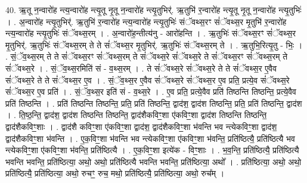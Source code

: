 \documentclass[17pt]{extarticle}
\begin{document}
40. ऋ॒तू न॒न्वारो॑ह न्त्य॒न्वारो॑ह न्त्यृ॒तू नृ॒तू न॒न्वारो॑ह न्त्यृ॒तुभिर्॑. ऋ॒तुभि॑ र॒न्वारो॑ह न्त्यृ॒तू नृ॒तू न॒न्वारो॑ह न्त्यृ॒तुभिः॑ । . अ॒न्वारो॑ह न्त्यृ॒तुभिर्॑. ऋ॒तुभि॑ र॒न्वारो॑ह न्त्य॒न्वारो॑ह न्त्यृ॒तुभिः॑ संॅवथ्स॒रꣳ सं॑ॅवथ्स॒र मृ॒तुभि॑ र॒न्वारो॑ह न्त्य॒न्वारो॑ह न्त्यृ॒तुभिः॑ संॅवथ्स॒रम् । . अ॒न्वारो॑ह॒न्तीत्य॑नु - आरो॑हन्ति । . ऋ॒तुभिः॑ संॅवथ्स॒रꣳ सं॑ॅवथ्स॒र मृ॒तुभिर्॑. ऋ॒तुभिः॑ संॅवथ्स॒रम् ते ते सं॑ॅवथ्स॒र मृ॒तुभिर्॑. ऋ॒तुभिः॑ संॅवथ्स॒रम् ते । . ऋ॒तुभि॒रित्यृ॒तु - भिः॒ । . सं॒ॅव॒थ्स॒रम् ते ते सं॑ॅवथ्स॒रꣳ सं॑ॅवथ्स॒रम् ते सं॑ॅवथ्स॒रे सं॑ॅवथ्स॒रे ते सं॑ॅवथ्स॒रꣳ सं॑ॅवथ्स॒रम् ते सं॑ॅवथ्स॒रे । . सं॒ॅव॒थ्स॒रमिति॑ सं - व॒थ्स॒रम् । . ते सं॑ॅवथ्स॒रे सं॑ॅवथ्स॒रे ते ते सं॑ॅवथ्स॒र ए॒वैव सं॑ॅवथ्स॒रे ते ते सं॑ॅवथ्स॒र ए॒व । . सं॒ॅव॒थ्स॒र ए॒वैव सं॑ॅवथ्स॒रे सं॑ॅवथ्स॒र ए॒व प्रति॒ प्रत्ये॒व सं॑ॅवथ्स॒रे सं॑ॅवथ्स॒र ए॒व प्रति॑ । . सं॒ॅव॒थ्स॒र इति॑ सं - व॒थ्स॒रे । . ए॒व प्रति॒ प्रत्ये॒वैव प्रति॑ तिष्ठन्ति तिष्ठन्ति॒ प्रत्ये॒वैव प्रति॑ तिष्ठन्ति । . प्रति॑ तिष्ठन्ति तिष्ठन्ति॒ प्रति॒ प्रति॑ तिष्ठन्ति॒ द्वाद॑श॒ द्वाद॑श तिष्ठन्ति॒ प्रति॒ प्रति॑ तिष्ठन्ति॒ द्वाद॑श । . ति॒ष्ठ॒न्ति॒ द्वाद॑श॒ द्वाद॑श तिष्ठन्ति तिष्ठन्ति॒ द्वाद॑शैकविꣳ॒॒शा ए॑कविꣳ॒॒शा द्वाद॑श तिष्ठन्ति तिष्ठन्ति॒ द्वाद॑शैकविꣳ॒॒शाः । . द्वाद॑शै कविꣳ॒॒शा ए॑कविꣳ॒॒शा द्वाद॑श॒ द्वाद॑शैकविꣳ॒॒शा भ॑वन्ति भव न्त्येकविꣳ॒॒शा द्वाद॑श॒ द्वाद॑शैकविꣳ॒॒शा भ॑वन्ति । . ए॒क॒विꣳ॒॒शा भ॑वन्ति भव न्त्येकविꣳ॒॒शा ए॑कविꣳ॒॒शा भ॑वन्ति॒ प्रति॑ष्ठित्यै॒ प्रति॑ष्ठित्यै भव न्त्येकविꣳ॒॒शा ए॑कविꣳ॒॒शा भ॑वन्ति॒ प्रति॑ष्ठित्यै । . ए॒क॒विꣳ॒॒शा इत्ये॑क - विꣳ॒॒शाः । . भ॒व॒न्ति॒ प्रति॑ष्ठित्यै॒ प्रति॑ष्ठित्यै भवन्ति भवन्ति॒ प्रति॑ष्ठित्या॒ अथो॒ अथो॒ प्रति॑ष्ठित्यै भवन्ति भवन्ति॒ प्रति॑ष्ठित्या॒ अथो᳚ । . प्रति॑ष्ठित्या॒ अथो॒ अथो॒ प्रति॑ष्ठित्यै॒ प्रति॑ष्ठित्या॒ अथो॒ रुचꣳ॒॒ रुच॒ मथो॒ प्रति॑ष्ठित्यै॒ प्रति॑ष्ठित्या॒ अथो॒ रुच᳚म् । \newline
\end{document}
